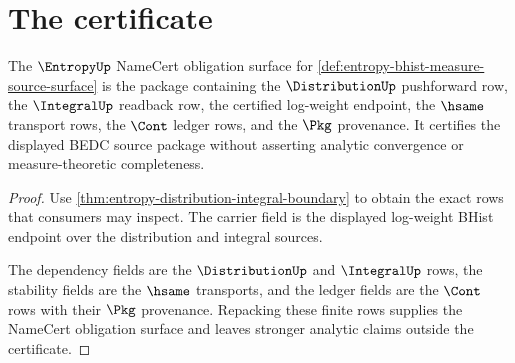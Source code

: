 \section{The certificate}
\label{sec:entropy-certificate}

\begin{theorem}
\label{thm:entropy-namecert-obligation-surface}
The $\EntropyUp$ NameCert obligation surface for
\autoref{def:entropy-bhist-measure-source-surface} is the package containing
the $\DistributionUp$ pushforward row, the $\IntegralUp$ readback row, the
certified log-weight endpoint, the $\hsame$ transport rows, the $\Cont$ ledger
rows, and the $\Pkg$ provenance. It certifies the displayed BEDC source package
without asserting analytic convergence or measure-theoretic completeness.
\end{theorem}
\begin{proof}
Use \autoref{thm:entropy-distribution-integral-boundary} to obtain the exact
rows that consumers may inspect. The carrier field is the displayed log-weight
BHist endpoint over the distribution and integral sources.

The dependency fields are the $\DistributionUp$ and $\IntegralUp$ rows, the
stability fields are the $\hsame$ transports, and the ledger fields are the
$\Cont$ rows with their $\Pkg$ provenance. Repacking these finite rows supplies
the NameCert obligation surface and leaves stronger analytic claims outside the
certificate.
\end{proof}

